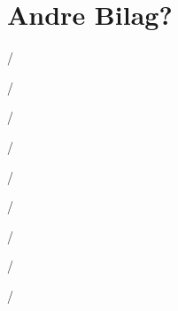 \section{Andre Bilag?}

\newpage


\newpageh/


\newpageh/


\newpageh/


\newpageh/


\newpageh/


\newpageh/


%

\newpageh/


\newpageh/


\newpageh/


\newpage




\newpage


\newpage


\newpage
